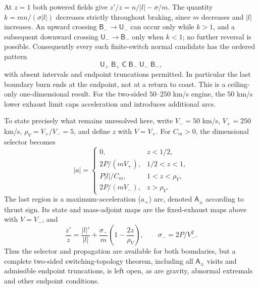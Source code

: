 \documentclass[journal,a4paper]{IEEEtran}
\begin{document}
At $z=1$ both powered fields give
$z'/z=n/|l|-\sigma/m$. The quantity
$k=mn/(\sigma|l|)$ decreases strictly throughout braking, since $m$
decreases and $|l|$ increases. An upward crossing $\mathsf B_-\to\mathsf U_-$
can occur only while $k>1$, and a subsequent downward crossing
$\mathsf U_-\to\mathsf B_-$ only when $k<1$; no further reversal is
possible. Consequently every such finite-switch normal candidate has
the ordered pattern
\begin{equation}
 \mathsf U_+\;\mathsf B_+\;\mathsf C\;\mathsf B_-\;
 \mathsf U_-\;\mathsf B_-,
\end{equation}
with absent intervals and endpoint truncations permitted. In particular
the last boundary burn ends at the endpoint, not at a return to coast.
This is a ceiling-only one-dimensional result. For the two-sided
$50$--$250$ km/s engine, the $50$ km/s lower exhaust limit caps
acceleration and introduces additional arcs.

To state precisely what remains unresolved here, write $V_-=50$ km/s,
$V_+=250$ km/s, $\rho_V=V_+/V_-=5$, and define $z$ with $V=V_+$.
For $C_m>0$, the dimensional selector becomes
\begin{equation}
 |a|=\begin{cases}
 0,&z<1/2,\\
 2P/(mV_+),&1/2<z<1,\\
 P|l|/C_m,&1<z<\rho_V,\\
 2P/(mV_-),&z>\rho_V.
 \end{cases}
\end{equation}
The last region is a maximum-acceleration ($a_+$) arc, denoted
$\mathsf A_\pm$ according to thrust sign. Its state and mass-adjoint
maps are the fixed-exhaust maps above with $V=V_-$, and
\begin{equation}
 \frac{z'}z=\frac{|l|'}{|l|}
   +\frac{\sigma_-}{m}\left(1-\frac{2z}{\rho_V}\right),
 \qquad\sigma_-=2P/V_-^2.
\end{equation}
Thus the selector and propagation are available for both boundaries,
but a complete two-sided switching-topology theorem, including all
$\mathsf A_\pm$ visits and admissible endpoint truncations, is left open,
as are gravity, abnormal extremals and other endpoint conditions.
\end{document}
